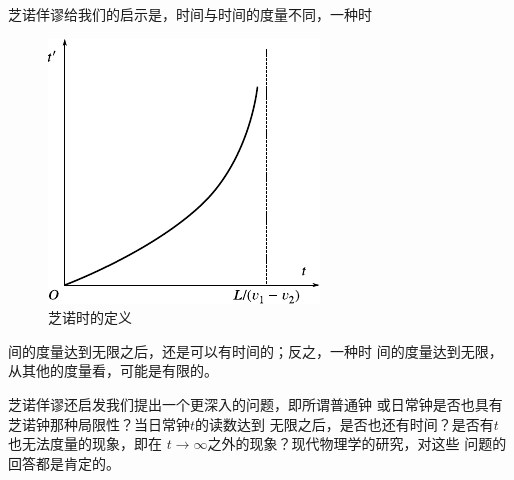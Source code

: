 芝诺佯谬给我们的启示是，时间与时间的度量不同，一种时

\begin{figure}
 \includegraphics{figure/fig01.03}
 \caption{芝诺时的定义}\label{fig:01.03}
\end{figure}
\noindent 间的度量达到无限之后，还是可以有时间的；反之，一种时
间的度量达到无限，从其他的度量看，可能是有限的。

芝诺佯谬还启发我们提出一个更深入的问题，即所谓普通钟
或日常钟是否也具有芝诺钟那种局限性？当日常钟$t$的读数达到
无限之后，是否也还有时间？是否有$t$也无法度量的现象，即在
$t\rightarrow\infty$之外的现象？现代物理学的研究，对这些
问题的回答都是肯定的。
